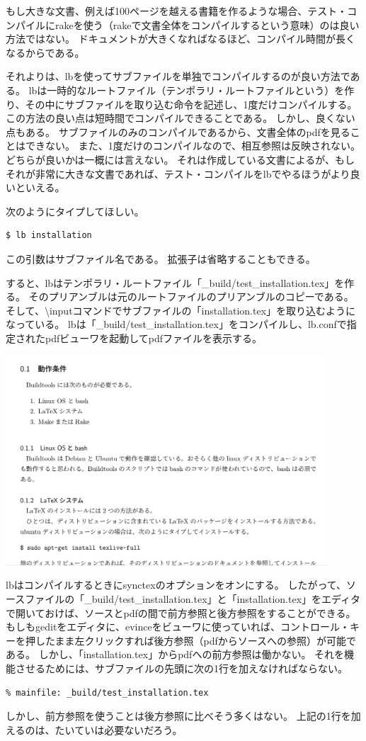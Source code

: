 もし大きな文書、例えば100ページを越える書籍を作るような場合、テスト・コンパイルにrakeを使う（rakeで文書全体をコンパイルするという意味）のは良い方法ではない。
ドキュメントが大きくなればなるほど、コンパイル時間が長くなるからである。

それよりは、lbを使ってサブファイルを単独でコンパイルするのが良い方法である。
lbは一時的なルートファイル（テンポラリ・ルートファイルという）を作り、その中にサブファイルを取り込む命令を記述し、1度だけコンパイルする。
この方法の良い点は短時間でコンパイルできることである。
しかし、良くない点もある。
サブファイルのみのコンパイルであるから、文書全体のpdfを見ることはできない。
また、1度だけのコンパイルなので、相互参照は反映されない。
どちらが良いかは一概には言えない。
それは作成している文書によるが、もしそれが非常に大きな文書であれば、テスト・コンパイルをlbでやるほうがより良いといえる。

次のようにタイプしてほしい。
\begin{verbatim}
$ lb installation
\end{verbatim}
この引数はサブファイル名である。
拡張子は省略することもできる。

すると、lbはテンポラリ・ルートファイル「\_build/test\_installation.tex」を作る。
そのプリアンブルは元のルートファイルのプリアンブルのコピーである。
そして、{\textbackslash}inputコマンドでサブファイルの「installation.tex」を取り込むようになっている。
lbは「\_build/test\_installation.tex」をコンパイルし、lb.confで指定されたpdfビューワを起動してpdfファイルを表示する。
\begin{center}
\includegraphics[width=12cm]{test_installation.png}
\end{center}

lbはコンパイルするときにsynctexのオプションをオンにする。
したがって、ソースファイルの「\_build/test\_installation.tex」と「installation.tex」をエディタで開いておけば、ソースとpdfの間で前方参照と後方参照をすることができる。
もしもgeditをエディタに、evinceをビューワに使っていれば、コントロール・キーを押したまま左クリックすれば後方参照（pdfからソースへの参照）が可能である。
しかし、「installation.tex」からpdfへの前方参照は働かない。
それを機能させるためには、サブファイルの先頭に次の1行を加えなければならない。
\begin{verbatim}
% mainfile: _build/test_installation.tex
\end{verbatim}
しかし、前方参照を使うことは後方参照に比べそう多くはない。
上記の1行を加えるのは、たいていは必要ないだろう。

